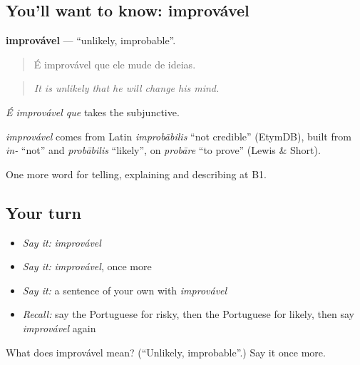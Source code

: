\subsection*{You'll want to know: improvável}
\textbf{improvável} — \textquotedblleft{}unlikely, improbable\textquotedblright{}.

\begin{quote}
É improvável que ele mude de ideias.
\end{quote}

\begin{quote}
\emph{It is unlikely that he will change his mind.}
\end{quote}

\emph{É improvável que} takes the subjunctive.

\begin{cousinweb}
\emph{improvável} comes from Latin \emph{improbābilis} \textquotedblleft{}not credible\textquotedblright{} (EtymDB), built from \emph{in-} \textquotedblleft{}not\textquotedblright{} and \emph{probābilis} \textquotedblleft{}likely\textquotedblright{}, on \emph{probāre} \textquotedblleft{}to prove\textquotedblright{} (Lewis \& Short).
\end{cousinweb}

\begin{grammarlens}[title={What you've built}]
One more word for telling, explaining and describing at B1.
\end{grammarlens}

\subsection*{Your turn}
\begin{itemize}
\raggedright
  \item \emph{Say it:} \emph{improvável}
  \item \emph{Say it:} \emph{improvável}, once more
  \item \emph{Say it:} a sentence of your own with \emph{improvável}
  \item \emph{Recall:} say the Portuguese for risky, then the Portuguese for likely, then say \emph{improvável} again
\end{itemize}

\begin{tcolorbox}[breakable,colback=teal!4,colframe=teal!35!black,title={Before you move on}]
What does improvável mean? (\textquotedblleft{}Unlikely, improbable\textquotedblright{}.) Say it once more.
\end{tcolorbox}
